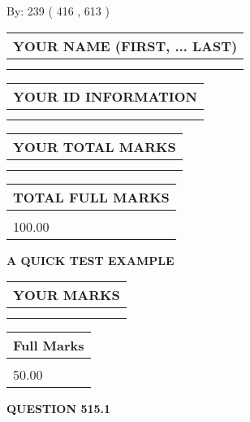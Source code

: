 \documentclass[12pt]{article}
\begin{document}
   
\hspace{1.0in} By: 
 239 ( 416 ,  613 )
   
   
   
   
\newpage 
\setcounter{page}{ 
   515001 } 
   
   
   
   
\noindent\begin{tabular}{|l|}
\hline
YOUR NAME (FIRST, ... LAST)  \\
\hline
 \\ 
 \\ 
\hline
\end{tabular}
\hspace{0.05in} \begin{tabular}{|l|}
\hline
 YOUR   ID   INFORMATION  \\
\hline
 \\ 
 \\ 
\hline
\end{tabular}
   
   
\vspace{0.2in}\noindent\begin{tabular}{|l|}
\hline
YOUR TOTAL MARKS  \\
\hline
 \\ 
 \\ 
\hline
\end{tabular}
\hspace{0.05in} \begin{tabular}{|l|}
\hline
TOTAL FULL MARKS  \\
\hline
 \\ 
100.00 \\
\hline
\end{tabular}
   
   
 \vspace{0.2in}
{\LARGE {\textbf{ A QUICK TEST EXAMPLE}}}
   
   
  
\vspace{0.2in}
  
\noindent\begin{tabular}{|l|}
\hline
 YOUR MARKS  \\
\hline
 \\ 
 \\ 
\hline
\end{tabular}
\hspace{0.05in} \begin{tabular}{|l|}
\hline
 Full Marks  \\
\hline
 \\ 
50.00 \\
\hline
\end{tabular}
{\textbf{\Large{QUESTION
515.1 
}}}
  
\end{document}
